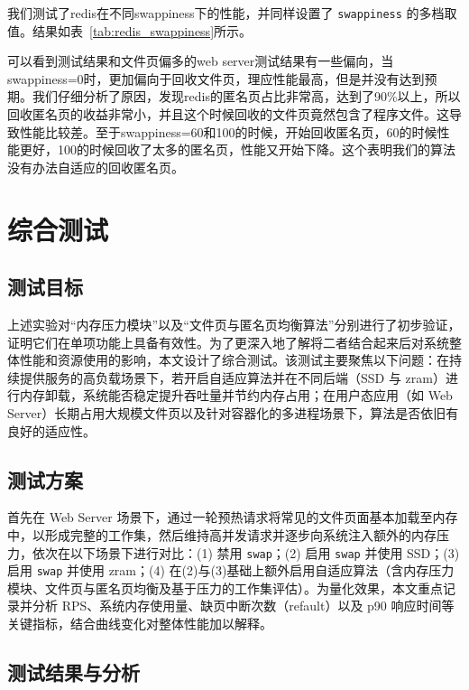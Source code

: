 我们测试了redis在不同swappiness下的性能，并同样设置了 \texttt{swappiness} 的多档取值。结果如表~\ref{tab:redis_swappiness}所示。

可以看到测试结果和文件页偏多的web server测试结果有一些偏向，当swappiness=0时，更加偏向于回收文件页，理应性能最高，但是并没有达到预期。我们仔细分析了原因，发现redis的匿名页占比非常高，达到了90\%以上，所以回收匿名页的收益非常小，并且这个时候回收的文件页竟然包含了程序文件。这导致性能比较差。至于swappiness=60和100的时候，开始回收匿名页，60的时候性能更好，100的时候回收了太多的匿名页，性能又开始下降。这个表明我们的算法没有办法自适应的回收匿名页。

\section{综合测试}

\subsection{测试目标}

上述实验对“内存压力模块”以及“文件页与匿名页均衡算法”分别进行了初步验证，证明它们在单项功能上具备有效性。为了更深入地了解将二者结合起来后对系统整体性能和资源使用的影响，本文设计了综合测试。该测试主要聚焦以下问题：在持续提供服务的高负载场景下，若开启自适应算法并在不同后端（SSD 与 zram）进行内存卸载，系统能否稳定提升吞吐量并节约内存占用；在用户态应用（如 Web Server）长期占用大规模文件页以及针对容器化的多进程场景下，算法是否依旧有良好的适应性。

\subsection{测试方案}

首先在 Web Server 场景下，通过一轮预热请求将常见的文件页面基本加载至内存中，以形成完整的工作集，然后维持高并发请求并逐步向系统注入额外的内存压力，依次在以下场景下进行对比：(1) 禁用 \texttt{swap}；(2) 启用 \texttt{swap} 并使用 SSD；(3) 启用 \texttt{swap} 并使用 zram；(4) 在(2)与(3)基础上额外启用自适应算法（含内存压力模块、文件页与匿名页均衡及基于压力的工作集评估）。为量化效果，本文重点记录并分析 RPS、系统内存使用量、缺页中断次数（refault）以及 p90 响应时间等关键指标，结合曲线变化对整体性能加以解释。

\subsection{测试结果与分析}
\label{sec:test_result}

